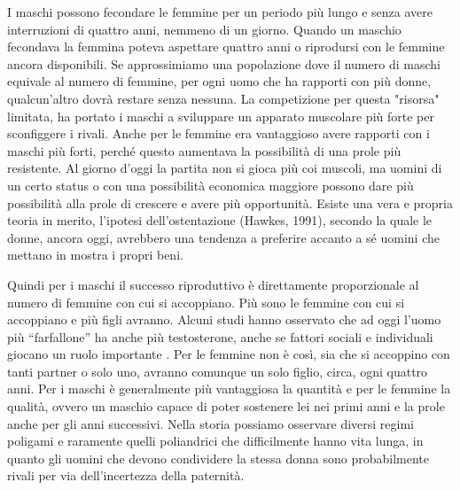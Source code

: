 \documentclass[12pt]{book} %
\begin{document}
I maschi possono fecondare le femmine per un periodo più lungo e senza avere interruzioni di quattro anni, nemmeno di un giorno. Quando un maschio fecondava la femmina poteva aspettare quattro anni o riprodursi con le femmine ancora disponibili. Se approssimiamo una popolazione dove il numero di maschi equivale al numero di femmine, per ogni uomo che ha rapporti con più donne, qualcun'altro dovrà restare senza nessuna. La competizione per questa "risorsa" limitata, ha portato i maschi a sviluppare un apparato muscolare più forte per sconfiggere i rivali. Anche per le femmine era vantaggioso avere rapporti con i maschi più forti, perché questo aumentava la possibilità di una prole più resistente.
Al giorno d'oggi la partita non si gioca più coi muscoli, ma uomini di un certo status o con una possibilità economica maggiore possono dare più possibilità alla prole di crescere e avere più opportunità. Esiste una vera e propria teoria in merito, l'ipotesi dell'ostentazione (Hawkes, 1991), secondo la quale le donne, ancora oggi, avrebbero una tendenza a preferire accanto a sé uomini che mettano in mostra i propri beni. 

Quindi per i maschi il successo riproduttivo è direttamente proporzionale al numero di femmine con cui si accoppiano.
Più sono le femmine con cui si accoppiano e più figli avranno. Alcuni studi hanno osservato che ad oggi l'uomo più “farfallone” ha anche più testosterone, anche se fattori sociali e individuali giocano un ruolo importante . Per le femmine non è così, sia che si accoppino con tanti partner o solo uno, avranno comunque un solo figlio, circa, ogni quattro anni. Per i maschi è generalmente più vantaggiosa la quantità e per le femmine la qualità, ovvero un maschio capace di poter sostenere lei nei primi anni e la prole anche per gli anni successivi.
Nella storia possiamo osservare diversi regimi poligami e raramente quelli poliandrici che difficilmente hanno vita lunga, in quanto gli uomini che devono condividere la stessa donna sono probabilmente rivali per via dell'incertezza della paternità.
\end{document}
